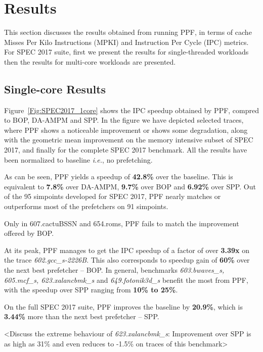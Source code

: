 \section{Results}
\label{Results}

This section discusses the results obtained from running PPF, in
terms of cache Misses Per Kilo Instructions (MPKI) and Instruction Per
Cycle (IPC) metrics.  For SPEC 2017 suite, first we present the
results for single-threaded workloads then the results for multi-core
workloads are presented.

\subsection{Single-core Results}
\label{Results-Single}


Figure~\ref{Fig:SPEC2017_1core} shows the IPC speedup obtained by
PPF, compred to BOP, DA-AMPM and SPP. 
In the figure we have depicted selected traces, where PPF shows a 
noticeable improvement or shows some degradation, along with the 
geometric mean improvement on the memory intensive subset of SPEC 2017, 
and finally for the complete SPEC 2017 benchmark. 
All the results have been normalized to baseline \textit{i.e.}, no
prefetching.  

As can be seen, PPF yields a speedup of \textbf{42.8\%} over
the baseline. This is equivalent to \textbf{7.8\%} over DA-AMPM, \textbf{9.7\%} over BOP
and \textbf{6.92\%} over SPP.  Out of the 95 simpoints developed for SPEC 2017, 
PPF nearly matches or outperforms most of the prefetchers on 91 simpoints.

Only in 607.cactuBSSN and 654.roms, PPF fails to match the improvement 
offered by BOP.

At its peak, PPF manages to get the IPC speedup of a factor of
over \textbf{3.39x} on the trace \textit{602.gcc\_s-2226B}.  This also
corresponds to speedup gain of \textbf{60\%} over the next best
prefetcher -- BOP. 
In general, benchmarks \textit{603.bwaves\_s, 605.mcf\_s, 623.xalancbmk\_s} 
and \textit{649.fotonik3d\_s} benefit the most from PPF, with the speedup over
SPP ranging from \textbf{10\% to 25\%}.

On the full SPEC 2017 suite, PPF improves the baseline by \textbf{20.9\%},
which is \textbf{3.44\%} more than the next best prefetcher -- SPP.

<Discuss the extreme behaviour of \textit{623.xalancbmk\_s}:
Improvement over SPP is as high as 31\% and even reduces to -1.5\% on
traces of this benchmark>\newline

